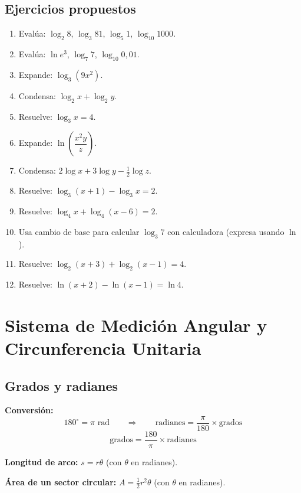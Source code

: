 \documentclass[12pt, a4paper]{article}
\begin{document}
  \subsection{Ejercicios propuestos}

  \begin{enumerate}[leftmargin=*, resume]
    \item \facil{} Evalúa: $\log_2 8$, $\log_3 81$, $\log_5 1$, $\log_{10} 1000$.
    \item \facil{} Evalúa: $\ln e^3$, $\log_7 7$, $\log_{10} 0{,}01$.
    \item \facil{} Expande: $\log_3(9x^2)$.
    \item \facil{} Condensa: $\log_2 x + \log_2 y$.
    \item \facil{} Resuelve: $\log_3 x = 4$.
    \item \medio{} Expande: $\ln\left(\dfrac{x^2 y}{z}\right)$.
    \item \medio{} Condensa: $2\log x + 3\log y - \frac{1}{2}\log z$.
    \item \medio{} Resuelve: $\log_3(x + 1) - \log_3 x = 2$.
    \item \medio{} Resuelve: $\log_4 x + \log_4(x - 6) = 2$.
    \item \medio{} Usa cambio de base para calcular $\log_3 7$ con calculadora (expresa usando $\ln$).
    \item \dificil{} Resuelve: $\log_2(x + 3) + \log_2(x - 1) = 4$.
    \item \dificil{} Resuelve: $\ln(x + 2) - \ln(x - 1) = \ln 4$.
  \end{enumerate}

  \section{Sistema de Medición Angular y Circunferencia Unitaria}

  \subsection{Grados y radianes}

  \begin{cuadroteoria}
    \textbf{Conversión:}
    $$180^\circ = \pi \text{ rad} \qquad\Longrightarrow\qquad \text{radianes} = \frac{\pi}{180} \times \text{grados}$$
    $$\text{grados} = \frac{180}{\pi} \times \text{radianes}$$

    \textbf{Longitud de arco:} $s = r\theta$ (con $\theta$ en radianes).

    \textbf{Área de un sector circular:} $A = \frac{1}{2}r^2 \theta$ (con $\theta$ en radianes).
  \end{cuadroteoria}
\end{document}
